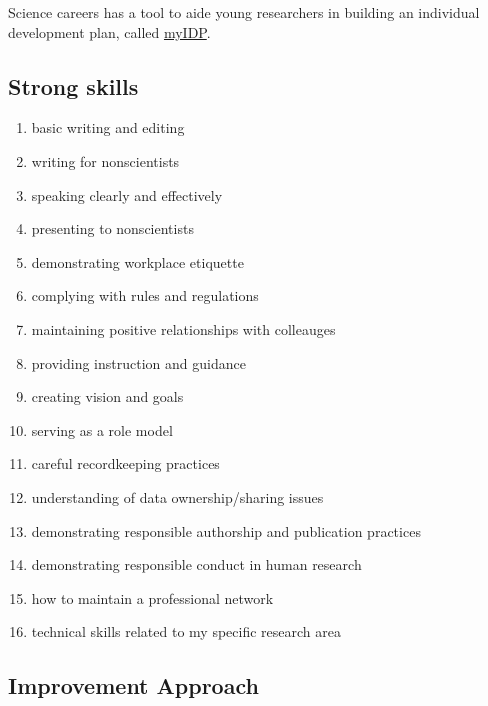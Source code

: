 Science careers has a tool to aide young researchers in building an individual development plan, called
\hyperlink{https://myidp.sciencecareers.org}{myIDP}.

\subsection{Strong skills}
\begin{enumerate}[noitemsep]
    \item basic writing and editing
    \item writing for nonscientists
    \item speaking clearly and effectively
    \item presenting to nonscientists
    \item demonstrating workplace etiquette
    \item complying with rules and regulations
    \item maintaining positive relationships with colleauges
    \item providing instruction and guidance
    \item creating vision and goals
    \item serving as a role model
    \item careful recordkeeping practices
    \item understanding of data ownership/sharing issues
    \item demonstrating responsible authorship and publication practices
    \item demonstrating responsible conduct in human research
    \item how to maintain a professional network
    \item technical skills related to my specific research area
\end{enumerate}


\subsection{Improvement Approach}

